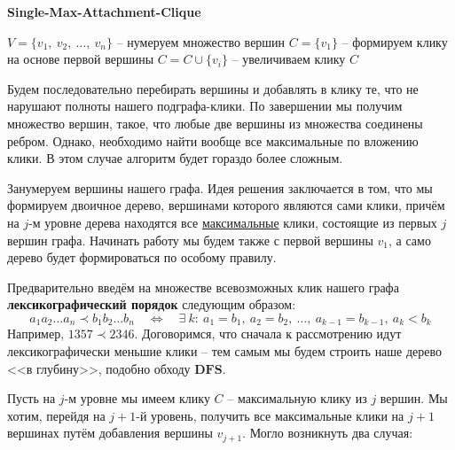 \documentclass[a4paper,12pt]{article}
\begin{document}
\begin{algorithm}[H]
    \caption{\textbf{Single-Max-Attachment-Clique}}
    \begin{algorithmic}
        \Statex
        \State $V = \{v_1,\ v_2,\ \ldots,\ v_n\}$ -- нумеруем множество вершин
        \State $C = \{v_1\}$ -- формируем клику на основе первой вершины
                \State $C = C \cup \{v_i\}$ -- увеличиваем клику
            \EndIf
        \EndFor
        \State\Return $C$
    \end{algorithmic}
\end{algorithm}
Будем последовательно перебирать вершины и добавлять в клику те, что не нарушают полноты нашего подграфа-клики. По завершении мы получим множество вершин, такое, что любые две вершины из множества соединены ребром. Однако, необходимо найти вообще все максимальные по вложению клики. В этом случае алгоритм будет гораздо более сложным. 

Занумеруем вершины нашего графа. Идея решения заключается в том, что мы формируем двоичное дерево, вершинами которого являются сами клики, причём на $j$-м уровне дерева находятся все \underline{максимальные} клики, состоящие из первых $j$ вершин графа. Начинать работу мы будем также с первой вершины $v_1$, а само дерево будет формироваться по особому правилу.

Предварительно введём на множестве всевозможных клик нашего графа \textbf{лексикографический порядок} следующим образом:
\[
a_1a_2\ldots a_n \prec b_1b_2\ldots b_n \quad \iff \quad \exists\ k: \: a_1 = b_1,\ a_2 = b_2,\ \ldots,\ a_{k - 1} = b_{k - 1},\ a_k < b_k
\]
Например, $1357 \prec 2346$.
Договоримся, что сначала к рассмотрению идут лексикографически меньшие клики -- тем самым мы будем строить наше дерево <<в глубину>>, подобно обходу $\textbf{DFS}$.

Пусть на $j$-м уровне мы имеем клику $C$ -- максимальную клику из $j$ вершин. Мы хотим, перейдя на $j + 1$-й уровень, получить все максимальные клики на $j + 1$ вершинах путём добавления вершины $v_{j + 1}$. Могло возникнуть два случая:
\end{document}
